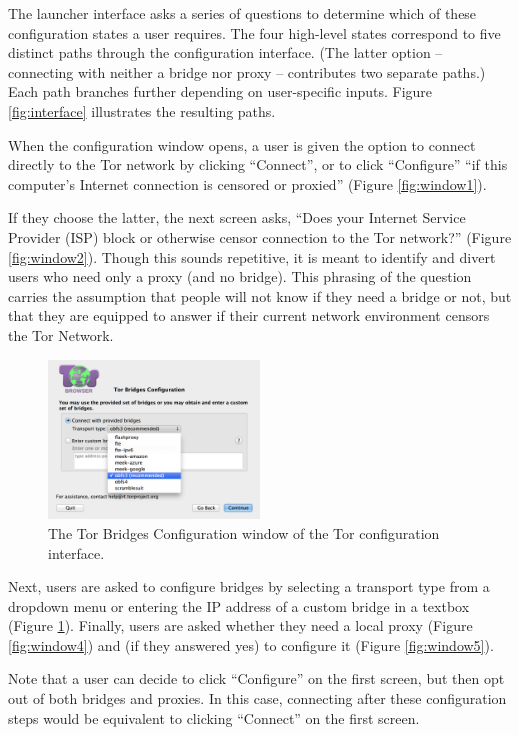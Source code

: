 \documentclass{template}
\begin{document}
The launcher interface asks a series of questions to
determine which of these configuration states a user requires.
The four high-level states correspond to five distinct paths through the
configuration interface. (The latter option -- connecting with neither a bridge
nor proxy -- contributes two separate paths.) Each path branches further
depending on user-specific inputs. Figure \ref{fig:interface} illustrates the
resulting paths. 

When the configuration window opens, a user is given the option to connect
directly to the Tor network by clicking ``Connect'', or to click ``Configure''
``if this computer's Internet connection is censored or proxied'' (Figure
\ref{fig:window1}).

If they choose the latter, the next screen asks, ``Does your Internet Service
Provider (ISP) block or otherwise censor connection to the Tor network?''
(Figure \ref{fig:window2}). Though this sounds repetitive, it is meant to
identify and divert users who need only a proxy (and no bridge).
This phrasing of the question carries the assumption that people will
not know if they need a bridge or not, but that they are equipped to answer if their
current network environment censors the Tor Network. 

\begin{figure}[t]
\label{fig:bridges}
  \centering
    \includegraphics[width=0.5\textwidth]{configuration-screenshot.png}
    \caption{The Tor Bridges Configuration window of the Tor configuration
    interface.}
\label{fig:bridges}
\end{figure}

Next, users are asked to configure bridges by selecting a transport type from a
dropdown menu or entering the IP address of a custom bridge in a textbox (Figure
\ref{fig:bridges}).
Finally, users are asked whether they need a local proxy (Figure
\ref{fig:window4}) and (if they answered yes) to configure it (Figure
\ref{fig:window5}).

Note that a user can decide to click ``Configure'' on the first screen, but then
opt out of both bridges and proxies.
In this case, connecting after these configuration steps
would be equivalent to clicking ``Connect'' on the first screen. \\ 
\end{document}
